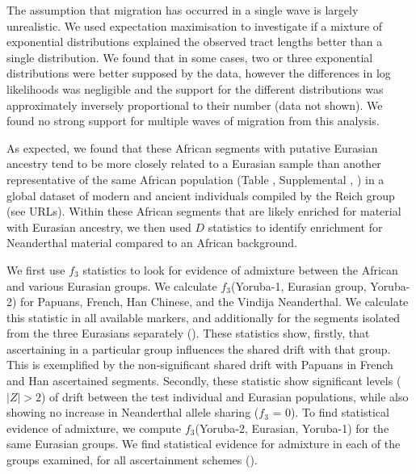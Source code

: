 The assumption that migration has occurred in a single wave is largely unrealistic. We used expectation maximisation to investigate if a mixture of exponential distributions explained the observed tract lengths better than a single distribution. We found that in some cases, two or three exponential distributions were better supposed by the data, however the differences in log likelihoods was negligible and the support for the different distributions was approximately inversely proportional to their number (data not shown). We found no strong support for multiple waves of migration from this analysis.


As expected, we found that these African segments with putative Eurasian ancestry tend to be more closely related to a Eurasian sample than another representative of the same African population (Table , Supplemental , ) in a global dataset of modern and ancient individuals compiled by the Reich group (see URLs). Within these African segments that are likely enriched for material with Eurasian ancestry, we then used $D$ statistics \cite{Patterson2012} to identify enrichment for Neanderthal material compared to an African background. 

We first use $f_3$ statistics to look for evidence of admixture between the African and various Eurasian groups. We calculate $f_3$(Yoruba-1, Eurasian group, Yoruba-2) for Papuans, French, Han Chinese, and the Vindija Neanderthal. We calculate this statistic in all available markers, and additionally for the segments isolated from the three Eurasians separately (). These statistics show, firstly, that ascertaining in a particular group influences the shared drift with that group. This is exemplified by the non-significant shared drift with Papuans in French and Han ascertained segments. Secondly, these statistic show significant levels ($|Z|>2$) of drift between the test individual and Eurasian populations, while also showing no increase in Neanderthal allele sharing ($f_3$ = 0). To find statistical evidence of admixture, we compute $f_3$(Yoruba-2, Eurasian, Yoruba-1) for the same Eurasian groups. We find statistical evidence for admixture in each of the groups examined, for all ascertainment schemes (). 


